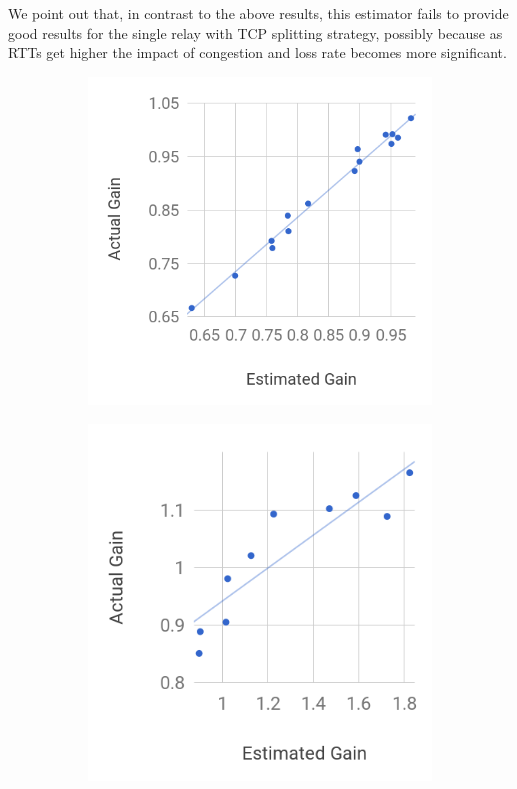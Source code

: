 \documentclass[newfonts=false,format=sigconf,10pt,letterpaper]{acmart}
\begin{document}
We point out that, in contrast to the above results, this estimator fails to provide good results for the single relay with TCP splitting strategy, possibly because as RTTs get higher the impact of congestion and loss rate becomes more significant.

\begin{figure}[t]
  \centering
  
    \begin{subfigure}{0.47\columnwidth}
  \centering
  \includegraphics[width=\columnwidth]{figures/gainEstimateVsActual-nat-1hop-newer}
    \caption{}
    \label{fig:rtt-estimate-nat-1hop}
\end{subfigure} \hfill
\begin{subfigure}{0.47\columnwidth}
  \centering
  \includegraphics[width=\columnwidth]{figures/gainEstimateVsActual-ssh-3hop-newer}

\end{subfigure}
\end{figure}
\end{document}
